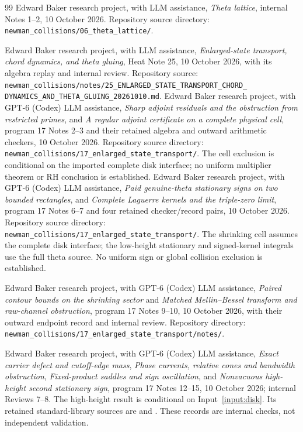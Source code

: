 \documentclass[11pt]{article}
\theoremstyle{definition}
\theoremstyle{remark}
\begin{document}
\begin{thebibliography}{99}
Edward Baker research project, with LLM assistance,
\emph{Theta lattice}, internal Notes 1--2, 10 October 2026.
Repository source directory:
\texttt{newman\_collisions/06\_theta\_lattice/}.

Edward Baker research project, with LLM assistance,
\emph{Enlarged-state transport, chord dynamics, and theta gluing},
Heat Note 25, 10 October 2026, with its algebra replay and internal review.
Repository source:
\texttt{newman\_collisions/notes/25\_ENLARGED\_STATE\_TRANSPORT\_CHORD\_}
\texttt{DYNAMICS\_AND\_THETA\_GLUING\_20261010.md}.
Edward Baker research project, with GPT-6 (Codex) LLM assistance,
\emph{Sharp adjoint residuals and the obstruction from restricted primes},
and \emph{A regular adjoint certificate on a complete physical cell},
program 17 Notes 2--3 and their retained algebra and outward arithmetic
checkers, 10 October 2026. Repository source directory:
\texttt{newman\_collisions/17\_enlarged\_state\_transport/}.
The cell exclusion is conditional on the imported complete disk interface;
no uniform multiplier theorem or RH conclusion is established.
Edward Baker research project, with GPT-6 (Codex) LLM assistance,
\emph{Paid genuine-theta stationary signs on two bounded rectangles},
and \emph{Complete Laguerre kernels and the triple-zero limit},
program 17 Notes 6--7 and four retained checker/record pairs,
10 October 2026. Repository source directory:
\texttt{newman\_collisions/17\_enlarged\_state\_transport/}.
The shrinking cell assumes the complete disk interface; the low-height
stationary and signed-kernel integrals use the full theta source.
No uniform sign or global collision exclusion is established.

Edward Baker research project, with GPT-6 (Codex) LLM assistance,
\emph{Paired contour bounds on the shrinking sector} and
\emph{Matched Mellin--Bessel transform and raw-channel obstruction},
program 17 Notes 9--10, 10 October 2026, with their outward endpoint
record and internal review. Repository directory:
\texttt{newman\_collisions/17\_enlarged\_state\_transport/notes/}.

Edward Baker research project, with GPT-6 (Codex) LLM assistance,
\emph{Exact carrier defect and cutoff-edge mass},
\emph{Phase currents, relative cones and bandwidth obstruction},
\emph{Fixed-product saddles and sign oscillation}, and
\emph{Nonvacuous high-height second stationary sign},
program 17 Notes 12--15, 10 October 2026; internal Reviews 7--8.
The high-height result is conditional on Input~\ref{input:disk}.
Its retained standard-library sources are
 and
.
These records are internal checks, not independent validation.


\end{thebibliography}
\end{document}
